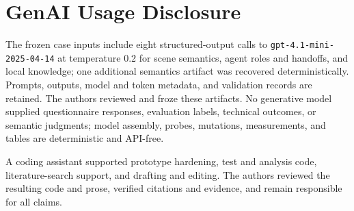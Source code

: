 \section*{GenAI Usage Disclosure}

The frozen case inputs include eight structured-output calls to
\texttt{gpt-4.1-mini-2025-04-14} at temperature 0.2 for scene semantics, agent
roles and handoffs, and local knowledge; one additional semantics artifact was
recovered deterministically.  Prompts, outputs, model and token metadata, and
validation records are retained.  The authors reviewed and froze these
artifacts.  No generative model supplied questionnaire responses, evaluation
labels, technical outcomes, or semantic judgments; model assembly, probes,
mutations, measurements, and tables are deterministic and API-free.

A coding assistant supported prototype hardening, test and analysis code,
literature-search support, and drafting and editing.  The authors reviewed the
resulting code and prose, verified citations and evidence, and remain
responsible for all claims.
